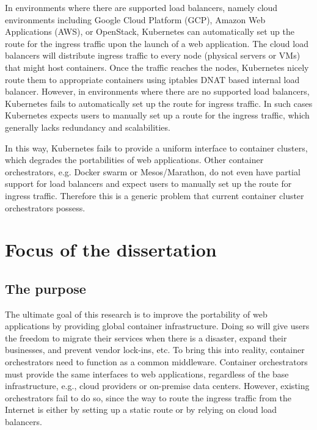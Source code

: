 In environments where there are supported load balancers, namely cloud environments including Google Cloud Platform (GCP), Amazon Web Applications (AWS), or OpenStack, Kubernetes can automatically set up the route for the ingress traffic upon the launch of a web application.
The cloud load balancers will distribute ingress traffic to every node (physical servers or VMs) that might host containers.
Once the traffic reaches the nodes, Kubernetes nicely route them to appropriate containers using iptables DNAT based internal load balancer.
%
However, in environments where there are no supported load balancers, Kubernetes fails to automatically set up the route for ingress traffic.
In such cases Kubernetes expects users to manually set up a route for the ingress traffic, which generally lacks redundancy and scalabilities.

In this way, Kubernetes fails to provide a uniform interface to container clusters, which degrades the portabilities of web applications.
Other container orchestrators, e.g. Docker swarm or Mesos/Marathon, do not even have partial support for load balancers and expect users to manually set up the route for ingress traffic.
Therefore this is a generic problem that current container cluster orchestrators possess.

\FloatBarrier

\section{Focus of the dissertation}

\subsection{The purpose}

  The ultimate goal of this research is to improve the portability of web applications by providing global container infrastructure.
  Doing so will give users the freedom to migrate their services when there is a disaster, expand their businesses, and prevent vendor lock-ins, etc.
  To bring this into reality, container orchestrators need to function as a common middleware. Container orchestrators must provide the same interfaces to web applications, regardless of the base infrastructure, e.g., cloud providers or on-premise data centers.
  However, existing orchestrators fail to do so, since the way to route the ingress traffic from the Internet is either by setting up a static route or by relying on cloud load balancers.

